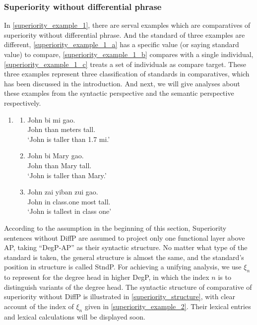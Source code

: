 \documentclass{ctexart}
\begin{document}
\subsubsection{Superiority without differential phrase}

\noindent
In \ref{superiority_example_1}, there are serval examples which are comparatives of superiority without differential phrase. And the standard of three examples are different, \ref{superiority_example_1_a} has a specific value (or saying standard value) to compare, \ref{superiority_example_1_b} compares with a single individual, \ref{superiority_example_1_c} treats a set of individuals as compare target. These three examples represent three classification of standards in comparatives, which has been discussed in the introduction. And next, we will give analyses about these examples from the syntactic perspective and the semantic perspective respectively.

\begin{enumerate}
    \item \label{superiority_example_1}
    \begin{enumerate}
        \item \label{superiority_example_1_a}
        John \enspace bi \enspace \enspace {} mi \enspace \enspace \enspace gao. \\
        John than  meters tall. \\
        `John is taller than 1.7 mi.' 

        \item \label{superiority_example_1_b}
        John \enspace bi \enspace Mary gao. \\
        John than Mary tall. \\
        `John is taller than Mary.' 

        \item \label{superiority_example_1_c}
        John zai \enspace yiban \enspace \enspace zui \enspace gao. \\
        John in \enspace class.one most tall. \\
        `John is tallest in class one' 

    \end{enumerate}
\end{enumerate}

According to the assumption in the beginning of this section, Superiority sentences without DiffP are assumed to project only one functional layer above AP, taking ``DegP-AP'' as their syntactic structure. No matter what type of the standard is taken, the general structure is almost the same, and the standard's position in structure is called StndP. For achieving a unifying analysis, we use $\xi_n$ to represent for the degree head in higher DegP, in which the index $n$ is to distinguish variants of the degree head. The syntactic structure of comparative of superiority without DiffP is illustrated in \ref{superiority_structure}, with clear account of the index of $\xi_n$ given in \ref{superiority_example_2}. Their lexical entries and lexical calculations will be displayed soon.
\end{document}
